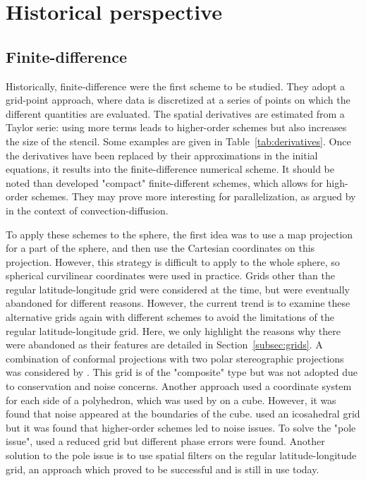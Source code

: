 \section{Historical perspective}
\label{sec:history}
\subsection{Finite-difference}
Historically, finite-difference were the first scheme to be studied. They
adopt a grid-point approach, where data is discretized at a series of points on which
the different quantities are evaluated. The spatial derivatives are estimated
from a Taylor serie: using more terms leads to higher-order schemes but also
increases the size of the \gls{stencil}. Some examples are given in
Table~\ref{tab:derivatives}. Once the derivatives have been replaced by their
approximations in the initial equations, it results into the finite-difference
numerical scheme. It should be noted than \cite{Lele1992} developed "compact"
finite-different schemes, which allows for high-order schemes. They may prove
more interesting for parallelization, as argued by~\cite{Dixon2003} in the
context of convection-diffusion.

To apply these schemes to the sphere, the first idea was to use a map projection
for a part of the sphere, and then use the Cartesian coordinates on this
projection. However, this strategy is difficult to apply to the whole sphere, so
spherical curvilinear coordinates were used in practice. Grids other than the
regular latitude-longitude grid were considered at the time, but were eventually
abandoned for different reasons.  However, the current trend is to examine these
alternative grids again with different schemes to avoid the limitations of the
regular latitude-longitude grid.  Here, we only highlight the reasons why there
were abandoned as their features are detailed in Section~\ref{subsec:grids}. A
combination of conformal projections with two polar stereographic projections
was considered by \cite{Phillips1957}. This grid is of the "composite" type but
was not adopted due to conservation and noise concerns. Another approach used a
coordinate system for each side of a polyhedron, which was used by
\cite{Sadourny1972} on a cube. However, it was found that noise appeared at the
boundaries of the cube. \cite{Sadourny1968} used an icosahedral grid but it was
found that higher-order schemes led to noise issues. To solve the "pole issue",
\cite{Kurihara1965} used a reduced grid but different phase errors were found.
Another solution to the pole issue is to use spatial filters on the regular
latitude-longitude grid, an approach which proved to be successful and is still
in use today.

